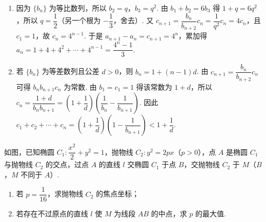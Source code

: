 \begin{solution}
\begin{enumerate}
\item 因为 \(\{b_n\}\) 为等比数列，所以 \(b_2=q\)，\(b_3=q^2\). 由 \(b_1+b_2=6b_3\) 得 \(1+q=6q^2\)，所以 \(q=\dfrac12\)（另一个根为 \(-\dfrac13\)，舍去）.
又 \(c_{n+1}=\dfrac{b_n}{b_{n+2}}c_n=\dfrac{1}{q^2}c_n=4c_n\)，且 \(c_1=1\)，故 \(c_n=4^{n-1}\). 于是 \(a_{n+1}-a_n=c_{n+1}=4^n\)，累加得
\(a_n=1+4+4^2+\cdots+4^{n-1}=\dfrac{4^n-1}{3}\).

\item 若 \(\{b_n\}\) 为等差数列且公差 \(d>0\)，则 \(b_n=1+(n-1)d\). 由 \(c_{n+1}=\dfrac{b_n}{b_{n+2}}c_n\) 可得 \(b_n b_{n+1}c_n\) 为常数. 由 \(b_1=c_1=1\) 得该常数为 \(1+d\)，所以
\(c_n=\dfrac{1+d}{b_n b_{n+1}}=\left(1+\dfrac1d\right)\left(\dfrac1{b_n}-\dfrac1{b_{n+1}}\right)\).
因此
\(c_1+c_2+\cdots+c_n=\left(1+\dfrac1d\right)\left(1-\dfrac1{b_{n+1}}\right)<1+\dfrac1d\).
\end{enumerate}
\end{solution}

\begin{problem}
如图，已知椭圆 \(C_1:\dfrac{x^2}{2}+y^2=1\)，抛物线 \(C_2:y^2=2px\)（\(p>0\)），点 \(A\) 是椭圆 \(C_1\) 与抛物线 \(C_2\) 的交点，过点 \(A\) 的直线 \(l\) 交椭圆 \(C_1\) 于点 \(B\)，交抛物线 \(C_2\) 于 \(M\)（\(B\)，\(M\) 不同于 \(A\)）.

\begin{enumerate}
\item 若 \(p=\dfrac{1}{16}\)，求抛物线 \(C_2\) 的焦点坐标；

\item 若存在不过原点的直线 \(l\) 使 \(M\) 为线段 \(AB\) 的中点，求 \(p\) 的最大值.
\end{enumerate}

\begin{center}
\end{center}
\end{problem}

